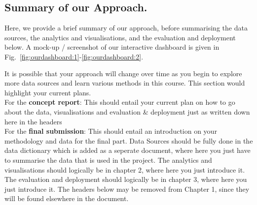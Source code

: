 \subsection{Summary of our Approach.}
Here, we provide a brief summary of our approach, before summarising the data sources, the analytics and visualisations, and the evaluation and deployment below. A mock-up / screenshot of our interactive dashboard is given in Fig.~\ref{fig:ourdashboard:1}-\ref{fig:ourdashboard:2}.

It is possible that your approach will change over time as you begin to explore more data sources and learn various methods in this course. This section would highlight your current plans. \\

For the \textbf{concept report}: This should entail your current plan on how to go about the data, visualisations and evaluation \& deployment just as written down here in the headers \\

For the \textbf{final submission}: This should entail an introduction on your methodology and data for the final part. Data Sources should be fully done in the data dictionary which is added as a seperate document, where here you just have to summarise the data that is used in the project. The analytics and visualisations should logically be in chapter 2, where here you just introduce it. The evaluation and deployment should logically be in chapter 3, where here you just introduce it. The headers below may be removed from Chapter 1, since they will be found elsewhere in the document. \\

